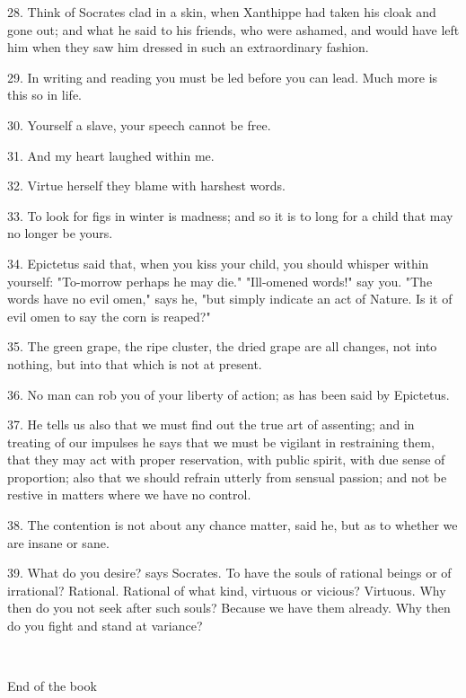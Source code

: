 \documentclass{book}
\newcommand\terminus[1]{\vspace{2em}\emph{#1} \\[2em] \begin{center}End of the \ordinalstring{chapter} book\end{center}}
\begin{document}
28. Think of Socrates clad in a skin, when Xanthippe had taken his
cloak and gone out; and what he said to his friends, who were ashamed,
and would have left him when they saw him dressed in such an
extraordinary fashion.

29. In writing and reading you must be led before you can lead. Much
more is this so in life.

30. Yourself a slave, your speech cannot be free.

31. And my heart laughed within me.

32. Virtue herself they blame with harshest words.

33. To look for figs in winter is madness; and so it is to long for a
child that may no longer be yours.

34. Epictetus said that, when you kiss your child, you should whisper
within yourself: "To-morrow perhaps he may die." "Ill-omened words!"
say you. "The words have no evil omen," says he, "but simply indicate
an act of Nature. Is it of evil omen to say the corn is reaped?"

35. The green grape, the ripe cluster, the dried grape are all
changes, not into nothing, but into that which is not at present.

36. No man can rob you of your liberty of action; as has been said by
Epictetus.

37. He tells us also that we must find out the true art of assenting;
and in treating of our impulses he says that we must be vigilant in
restraining them, that they may act with proper reservation, with
public spirit, with due sense of proportion; also that we should
refrain utterly from sensual passion; and not be restive in matters
where we have no control.

\newpage

38. The contention is not about any chance matter, said he, but as to
whether we are insane or sane.

39. What do you desire? says Socrates. To have the souls of rational
beings or of irrational? Rational. Rational of what kind, virtuous or
vicious? Virtuous. Why then do you not seek after such souls? Because
we have them already. Why then do you fight and stand at variance?

\terminus{}
\chapter[All that you desire...]{}
\end{document}
